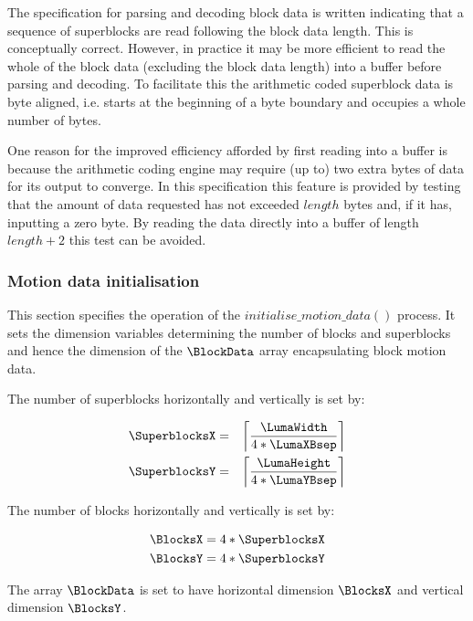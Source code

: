 \begin{informative}
The specification for parsing and decoding block data is written indicating that a sequence of 
superblocks are read following the block data length. This is conceptually correct. However, 
in practice it may be more efficient to read the whole of the block data (excluding the block 
data length) into a buffer before parsing and decoding. To facilitate this the arithmetic coded 
superblock data is byte aligned, i.e. starts at the beginning of a byte boundary and occupies a 
whole number of bytes.

One reason for the improved efficiency afforded by first reading into a buffer is because the 
arithmetic coding engine may require (up to) two extra bytes of data for its output to 
converge. In this specification this feature is provided by testing that the amount of data 
requested has not exceeded $length$ bytes and, if it has, inputting a zero byte. By 
reading the data directly into a buffer of length  $length + 2$ this test can be 
avoided.
\end{informative}

\subsubsection{Motion data initialisation}

\label{motioninit}

This section specifies the operation of the $initialise\_motion\_data()$ process. It sets the dimension variables determining the
number of blocks and superblocks and hence the dimension of the $\BlockData$ array encapsulating block motion
data.

The number of superblocks horizontally and vertically is set by:

\begin{eqnarray*}
\SuperblocksX & = & \left\lceil \frac{\LumaWidth}{4*\LumaXBsep} \right\rceil  \\
\SuperblocksY & = & \left\lceil \frac{\LumaHeight}{4*\LumaYBsep} \right\rceil 
\end{eqnarray*}

The number of blocks horizontally and vertically is set by:

\begin{eqnarray*}
\BlocksX = 4*\SuperblocksX \\
\BlocksY = 4*\SuperblocksY
\end{eqnarray*}

The array $\BlockData$ is set to have horizontal dimension $\BlocksX$ and vertical dimension $\BlocksY$.

